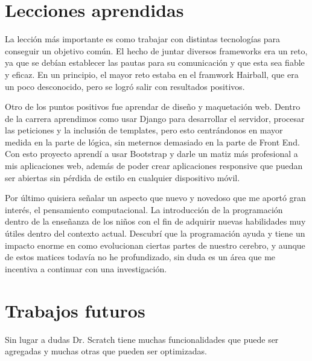 \documentclass[a4paper, 12pt]{book}
\begin{document}
\section{Lecciones aprendidas}
\label{sec:lecciones_aprendidas}

La lección más importante es como trabajar con distintas tecnologías para
conseguir un objetivo común. El hecho de juntar diversos frameworks era
un reto, ya que se debían establecer las pautas para su comunicación y 
que esta sea fiable y eficaz. En un principio, el mayor reto estaba en el
framwork Hairball, que era un poco desconocido, pero se logró salir con
resultados positivos.

Otro de los puntos positivos fue aprendar de diseño y maquetación web. Dentro
de la carrera aprendimos como usar Django para desarrollar el servidor, 
procesar las peticiones y la inclusión de templates, pero esto centrándonos
en mayor medida en la parte de lógica, sin meternos demasiado en la parte
de Front End. Con esto proyecto aprendí a usar Bootstrap y darle un matiz
más profesional a mis aplicaciones web, además de poder crear aplicaciones
responsive que puedan ser abiertas sin pérdida de estilo en cualquier
dispositivo móvil. 

Por último quisiera señalar un aspecto que nuevo y novedoso que me aportó
gran interés, el pensamiento computacional. La introducción de la 
programación dentro de la enseñanza de los niños con el fin de adquirir
nuevas habilidades muy útiles dentro del contexto actual. Descubrí que 
la programación ayuda y tiene un impacto enorme en como evolucionan 
ciertas partes de nuestro cerebro, y aunque de estos matices todavía
no he profundizado, sin duda es un área que me incentiva a continuar con
una investigación.


\section{Trabajos futuros}
\label{sec:trabajos_futuros}


Sin lugar a dudas Dr. Scratch tiene muchas funcionalidades que puede ser agregadas
y muchas otras que pueden ser optimizadas.
\end{document}
